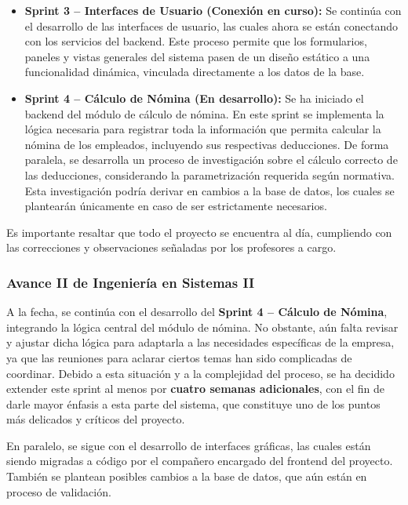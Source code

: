\begin{itemize}
	\item \textbf{Sprint 3 – Interfaces de Usuario (Conexión en curso):}  
	      Se continúa con el desarrollo de las interfaces de usuario, las cuales ahora se están conectando con los servicios del backend. Este proceso permite que los formularios, paneles y vistas generales del sistema pasen de un diseño estático a una funcionalidad dinámica, vinculada directamente a los datos de la base.

	\item \textbf{Sprint 4 – Cálculo de Nómina (En desarrollo):}  
	      Se ha iniciado el backend del módulo de cálculo de nómina. En este sprint se implementa la lógica necesaria para registrar toda la información que permita calcular la nómina de los empleados, incluyendo sus respectivas deducciones. De forma paralela, se desarrolla un proceso de investigación sobre el cálculo correcto de las deducciones, considerando la parametrización requerida según normativa.  
	      Esta investigación podría derivar en cambios a la base de datos, los cuales se plantearán únicamente en caso de ser estrictamente necesarios.
\end{itemize}

Es importante resaltar que todo el proyecto se encuentra al día, cumpliendo con las correcciones y observaciones señaladas por los profesores a cargo.

\subsubsection{Avance II de Ingeniería en Sistemas II}

A la fecha, se continúa con el desarrollo del \textbf{Sprint 4 – Cálculo de Nómina}, integrando la lógica central del módulo de nómina. No obstante, aún falta revisar y ajustar dicha lógica para adaptarla a las necesidades específicas de la empresa, ya que las reuniones para aclarar ciertos temas han sido complicadas de coordinar. Debido a esta situación y a la complejidad del proceso, se ha decidido extender este sprint al menos por \textbf{cuatro semanas adicionales}, con el fin de darle mayor énfasis a esta parte del sistema, que constituye uno de los puntos más delicados y críticos del proyecto.  

En paralelo, se sigue con el desarrollo de interfaces gráficas, las cuales están siendo migradas a código por el compañero encargado del frontend del proyecto. También se plantean posibles cambios a la base de datos, que aún están en proceso de validación.  

